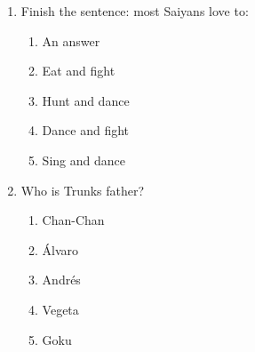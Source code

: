 \documentclass[letterpaper,addpoints,answers,twocolumn,10pt]{exam}
\begin{document}
\begin{enumerate}[leftmargin=.2in]
\begin{enumerate}[noitemsep,leftmargin=0in]
\end{enumerate}



\item  Finish the sentence: most Saiyans love to:


\begin{enumerate}[noitemsep,leftmargin=0in]


\item  An answer
\item  Eat and fight
\item  Hunt and dance
\item  Dance and fight
\item  Sing and dance


\end{enumerate}



\item  Who is Trunks father?


\begin{enumerate}[noitemsep,leftmargin=0in]


\item  Chan-Chan
\item  Álvaro
\item  Andrés
\item  Vegeta
\item  Goku


\end{enumerate}



\end{enumerate}
\end{document}
